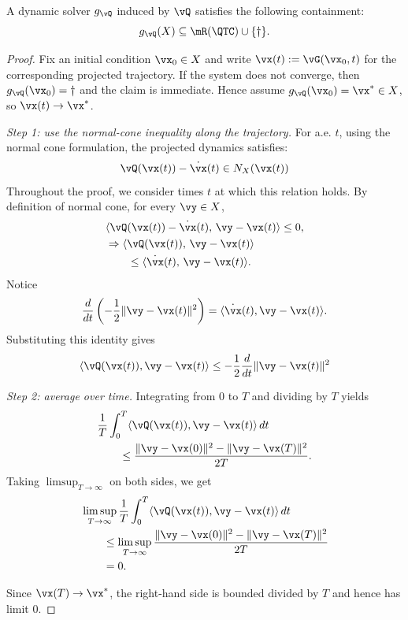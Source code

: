 \begin{lemma}\label{lemma:containment}
A dynamic solver $g_{\vQ}$ induced by $\vQ$ satisfies the following containment:
\[
g_{\vQ}(X) \subseteq \mR(\QTC) \cup \{\dagger\}.
\]
\end{lemma}
\begin{proof}\label{proof:containment}
Fix an initial condition $\vx_0\in X$ and write
$\vx(t):=\vG(\vx_0,t)$ for the corresponding projected trajectory. If the
system does not converge, then $g_{\vQ}(\vx_0)=\dagger$ and the claim is
immediate. Hence assume $g_{\vQ}(\vx_0)=\vx^*\in X$, so $\vx(t)\to \vx^*$.

\emph{Step 1: use the normal-cone inequality along the trajectory.}
For a.e. $t$, using the normal cone formulation, the projected dynamics satisfies:
\[
\vQ(\vx(t)) - \dot \vx(t)\in N_X(\vx(t))
\]
Throughout the proof, we consider times $t$ at which this relation holds. By definition of normal cone, for every $\vy\in X$,
\[
\begin{aligned}
&\langle \vQ(\vx(t))-\dot \vx(t),\,\vy-\vx(t)\rangle \le 0,\\
&\Rightarrow \langle \vQ(\vx(t)),\,\vy-\vx(t)\rangle\\
&\qquad\le \langle \dot \vx(t),\,\vy-\vx(t)\rangle.
\end{aligned}
\]
Notice
\[
\frac{d}{dt} \left(-\frac12 \|\vy-\vx(t)\|^2 \right)
=\langle \dot \vx(t),\vy-\vx(t)\rangle .
\]
Substituting this identity gives
\[
\langle \vQ(\vx(t)),\vy-\vx(t)\rangle
\le -\frac12\frac{d}{dt}\|\vy-\vx(t)\|^2
\]

\emph{Step 2: average over time.}
Integrating from $0$ to $T$ and dividing by $T$ yields
\[
\begin{aligned}
&\frac1T\int_0^T \langle \vQ(\vx(t)),\vy-\vx(t)\rangle\,dt\\
&\qquad\le \frac{\|\vy-\vx(0)\|^2-\|\vy-\vx(T)\|^2}{2T}.
\end{aligned}
\]
Taking $\limsup_{T\to\infty}$ on both sides, we get
\[
\begin{aligned}
&\limsup_{T\to\infty}
\frac1T\int_0^T \langle \vQ(\vx(t)),\vy-\vx(t)\rangle\,dt\\
&\qquad\le \limsup_{T\to\infty}
\frac{\|\vy-\vx(0)\|^2-\|\vy-\vx(T)\|^2}{2T}\\
&\qquad=0.
\end{aligned}
\]

Since $\vx(T)\to\vx^*$, the right-hand side is bounded divided by $T$ and hence
has limit $0$.


\end{proof}
